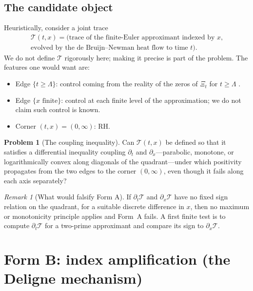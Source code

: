 \documentclass[11pt]{amsart}
\theoremstyle{definition}
\newtheorem{problem}[theorem]{Problem}
\theoremstyle{remark}
\newtheorem{remark}[theorem]{Remark}
\begin{document}
\subsection{The candidate object}
Heuristically, consider a joint trace
\begin{multline*}
\mathcal{T}(t,x)=\text{(trace of the finite-Euler approximant indexed by }x\text{,}\\
\text{evolved by the de Bruijn--Newman heat flow to time }t).
\end{multline*}
We do not define $\mathcal T$ rigorously here; making it precise is part of the problem. The
features one would want are:
\begin{itemize}
\item Edge $\{t\geq\Lambda\}$: control coming from the reality of the zeros of $\Xi_t$ for
$t\ge\Lambda$ \cite{dB,RT,P13}.
\item Edge $\{x\text{ finite}\}$: control at each finite level of the approximation; we do not
claim such control is known.
\item Corner $(t,x)=(0,\infty)$: RH.
\end{itemize}

\begin{problem}[The coupling inequality]\label{prob:coupling}
Can $\mathcal{T}(t,x)$ be defined so that it satisfies a differential inequality coupling
$\partial_t$ and $\partial_x$---parabolic, monotone, or logarithmically
convex along diagonals of the quadrant---under which positivity propagates
from the two edges to the corner $(0,\infty)$, even though it fails along
each axis separately?
\end{problem}

\begin{remark}[What would falsify Form A]
If $\partial_t\mathcal{T}$ and $\partial_x\mathcal{T}$ have no fixed sign relation on the
quadrant, for a suitable discrete difference in $x$, then no maximum or monotonicity
principle applies and Form~A fails. A first finite test is to compute $\partial_t\mathcal{T}$ for
a two-prime approximant and compare its sign to $\partial_x\mathcal{T}$.
\end{remark}

\section{Form B: index amplification (the Deligne mechanism)}\label{sec:formB}
\end{document}
